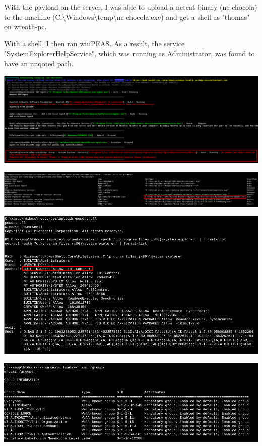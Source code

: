 With the payload on the server, I was able to upload a netcat binary (nc-chocola) to the machine (C:\textbackslash Windows\textbackslash temp\textbackslash nc-chocola.exe) and get a shell as "thomas" on wreath-pc.

With a shell, I then ran \href{https://github.com/carlospolop/PEASS-ng/blob/master/winPEAS/winPEASexe/binaries/Obfuscated\%20Releases/winPEASx64.exe}{winPEAS}. As a result, the service "SystemExplorerHelpService", which was running as Administrator, was found to have an unqoted path.

\includegraphics[width=\textwidth]{img/winpeas.png}

\includegraphics[width=\textwidth]{img/unquoted_service.png}

\includegraphics[width=\textwidth]{img/dir_fullcontrol.png}

\includegraphics[width=\textwidth]{img/groups.png}

